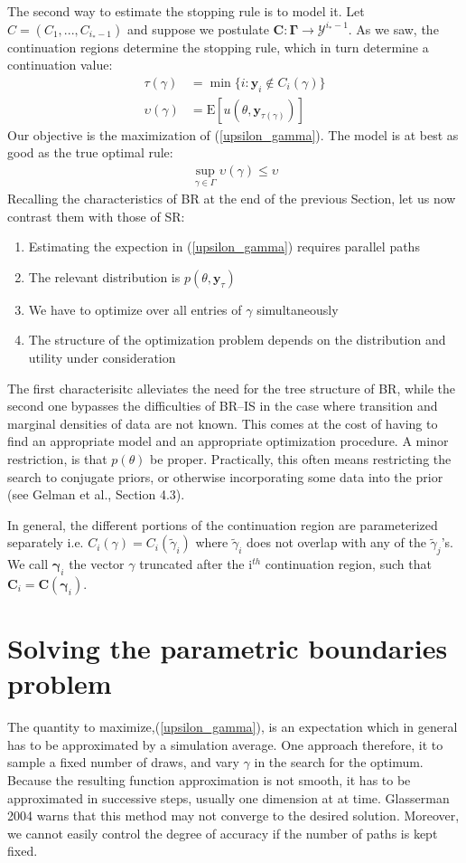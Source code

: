 \documentclass[11pt]{article}
\begin{document}
The second way to estimate the stopping rule is to model it. Let $C=(C_1,...,C_{i_*-1})$ and suppose we postulate $\mathbf{C}:\mathbf{\Gamma}\rightarrow \mathcal{Y}^{i_*-1}$. As we saw, the continuation regions determine the stopping rule, which in turn determine a continuation value:
\begin{align}\label{tau_gamma}
\tau(\gamma)&=\min\{i:\mathbf{y}_i\notin C_i(\gamma)\}\\
\label{upsilon_gamma}
\upsilon(\gamma)&=\mathrm{E}[u(\theta,\mathbf{y}_{\tau(\gamma)})]
\end{align}Our objective is the maximization of (\ref{upsilon_gamma}). The model is at best as good as the true optimal rule:
\begin{align}
\sup_{\gamma\in\Gamma}\upsilon(\gamma)\leq \upsilon
\end{align}Recalling the characteristics of BR at the end of the previous Section, let us now contrast them with those of SR:
\begin{enumerate}
\item Estimating the expection in (\ref{upsilon_gamma}) requires parallel paths
\item The relevant distribution is $p(\theta,\mathbf{y}_\tau)$
\item We have to optimize over all entries of $\gamma$ simultaneously
\item The structure of the optimization problem depends on the distribution and utility under consideration
\end{enumerate}The first characterisitc alleviates the need for the tree structure of BR, while the second one bypasses the difficulties of BR--IS in the case where transition and marginal densities of data are not known. 
This comes at the cost of having to find an appropriate model and an appropriate optimization procedure. A minor restriction, is that $p(\theta)$ be proper. Practically, this often means restricting the search to conjugate priors, or otherwise incorporating some data into the prior (see Gelman et al., Section 4.3).

In general, the different portions of the continuation region are parameterized separately i.e. $C_i(\gamma)=C_i(\tilde \gamma_i)$ where $\tilde \gamma_i$ does not overlap with any of the $\tilde \gamma_j$'s. We call $\boldsymbol{\gamma}_i$ the vector $\gamma$ truncated after the i$^{th}$ continuation region, such that $\mathbf{C}_i=\mathbf{C}(\boldsymbol\gamma_i)$.

\section{Solving the parametric boundaries problem}
The quantity to maximize,(\ref{upsilon_gamma}), is an expectation which in general has to be approximated by a simulation average. One approach therefore, it to sample a fixed number of draws, and vary $\gamma$ in the search for the optimum. Because the resulting function approximation is not smooth, it has to be approximated in successive steps, usually one dimension at at time. Glasserman 2004 warns that this method may not converge to the desired solution. Moreover, we cannot easily control the degree of accuracy if the number of paths is kept fixed.
\end{document}
